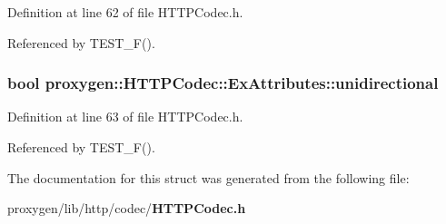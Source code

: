 Definition at line 62 of file H\+T\+T\+P\+Codec.\+h.



Referenced by T\+E\+S\+T\+\_\+\+F().

\subsubsection[{unidirectional}]{\setlength{\rightskip}{0pt plus 5cm}bool proxygen\+::\+H\+T\+T\+P\+Codec\+::\+Ex\+Attributes\+::unidirectional}\label{structproxygen_1_1HTTPCodec_1_1ExAttributes_afa10742fb9c34d03dcd531d9639db681}


Definition at line 63 of file H\+T\+T\+P\+Codec.\+h.



Referenced by T\+E\+S\+T\+\_\+\+F().



The documentation for this struct was generated from the following file\+:\begin{DoxyCompactItemize}
\item 
proxygen/lib/http/codec/{\bf H\+T\+T\+P\+Codec.\+h}\end{DoxyCompactItemize}
